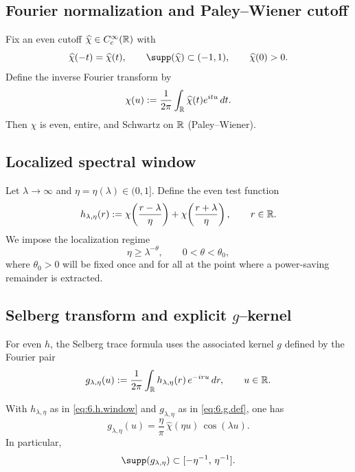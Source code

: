 \subsection{Fourier normalization and Paley--Wiener cutoff}\label{subsec:ch6-fourier}

Fix an even cutoff $\widehat\chi\in C_c^\infty(\mathbb{R})$ with
\begin{equation}\label{eq:6.chi.hat.lock}
\widehat\chi(-t)=\widehat\chi(t),\qquad
\supp(\widehat\chi)\subset(-1,1),\qquad
\widehat\chi(0)>0.
\end{equation}
Define the inverse Fourier transform by
\begin{equation}\label{eq:6.chi.def}
\chi(u):=\frac{1}{2\pi}\int_{\mathbb{R}}\widehat\chi(t)e^{itu}\,dt.
\end{equation}
Then $\chi$ is even, entire, and Schwartz on $\mathbb{R}$ (Paley--Wiener).

\subsection{Localized spectral window}\label{subsec:ch6-window}

Let $\lambda\to\infty$ and $\eta=\eta(\lambda)\in(0,1]$. Define the even test function
\begin{equation}\label{eq:6.h.window}
h_{\lambda,\eta}(r):=
\chi\!\left(\frac{r-\lambda}{\eta}\right)+
\chi\!\left(\frac{r+\lambda}{\eta}\right),
\qquad r\in\mathbb{R}.
\end{equation}
We impose the localization regime
\begin{equation}\label{eq:6.eta.regime}
\eta\ge \lambda^{-\theta},\qquad 0<\theta<\theta_0,
\end{equation}
where $\theta_0>0$ will be fixed once and for all at the point where a power-saving remainder is extracted.

\subsection{Selberg transform and explicit $g$--kernel}\label{subsec:ch6-selberg-transform}

For even $h$, the Selberg trace formula uses the associated kernel $g$ defined by the Fourier pair
\begin{equation}\label{eq:6.g.def}
g_{\lambda,\eta}(u):=\frac{1}{2\pi}\int_{\mathbb{R}} h_{\lambda,\eta}(r)\,e^{-iru}\,dr,
\qquad u\in\mathbb{R}.
\end{equation}

\begin{lemma}\label{lem:6.g.explicit}
With $h_{\lambda,\eta}$ as in \eqref{eq:6.h.window} and $g_{\lambda,\eta}$ as in \eqref{eq:6.g.def}, one has
\begin{equation}\label{eq:6.g.explicit}
g_{\lambda,\eta}(u)=\frac{\eta}{\pi}\,\widehat\chi(\eta u)\,\cos(\lambda u).
\end{equation}
In particular,
\begin{equation}\label{eq:6.g.support}
\supp(g_{\lambda,\eta})\subset[-\eta^{-1},\,\eta^{-1}].
\end{equation}
\end{lemma}

